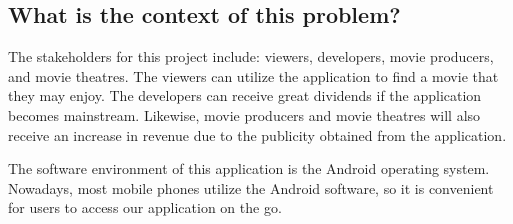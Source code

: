\documentclass[12pt]{article}
\begin{document}
\subsection*{What is the context of this problem?}
\indent

The stakeholders for this project include: viewers, developers, movie producers, and movie theatres. The viewers can utilize the application to find a movie that they may enjoy. The developers can receive great dividends if the application becomes mainstream. Likewise, movie producers and movie theatres will also receive an increase in revenue due to the publicity obtained from the application. 
	
The software environment of this application is the Android operating system. Nowadays, most mobile phones utilize the Android software, so it is convenient for users to access our application on the go.
\end{document}
